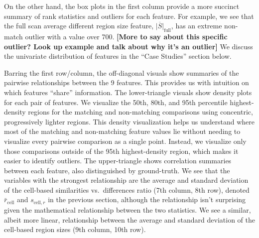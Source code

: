 \documentclass[11pt,]{isuthesis}
\begin{document}
On the other hand, the box plots in the first column provide a more succinct summary of rank statistics and outliers for each feature.
For example, we see that the full scan average different region size feature, \(\overline{|S|}_{\text{full}}\), has an extreme non-match outlier with a value over 700.
\textbf{{[}More to say about this specific outlier? Look up example and talk about why it's an outlier{]}}
We discuss the univariate distribution of features in the ``Case Studies'' section below.

Barring the first row/column, the off-diagonal visuals show summaries of the pairwise relationships between the 9 features.
This provides us with intuition on which features ``share'' information.
The lower-triangle visuals show density plots for each pair of features.
We visualize the 50th, 80th, and 95th percentile highest-density regions for the matching and non-matching comparisons using concentric, progressively lighter regions.
This density visualization helps us understand where most of the matching and non-matching feature values lie without needing to visualize every pairwise comparison as a single point.
Instead, we visualize only those comparisons outside of the 95th highest-density region, which makes it easier to identify outliers.
The upper-triangle shows correlation summaries between each feature, also distinguished by ground-truth.
We see that the variables with the strongest relationship are the average and standard deviation of the cell-based similarities vs.~differences ratio (7th column, 8th row), denoted \(\bar{r}_{\text{cell}}\) and \(s_{\text{cell},r}\) in the previous section, although the relationship isn't surprising given the mathematical relationship between the two statistics.
We see a similar, albeit more linear, relationship between the average and standard deviation of the cell-based region sizes (9th column, 10th row).
\end{document}

